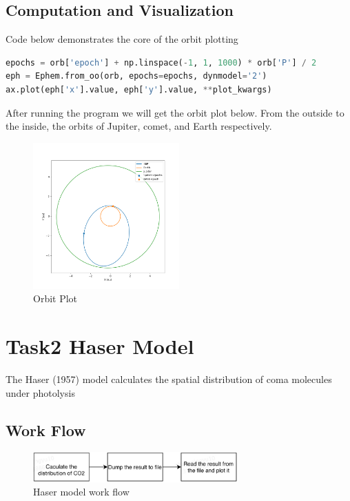 \documentclass{report}
\begin{document}
\subsection{Computation and Visualization}
Code below demonstrates the core of the orbit plotting
\begin{lstlisting}[language=Python]
epochs = orb['epoch'] + np.linspace(-1, 1, 1000) * orb['P'] / 2
eph = Ephem.from_oo(orb, epochs=epochs, dynmodel='2')
ax.plot(eph['x'].value, eph['y'].value, **plot_kwargs)
\end{lstlisting}
After running the program we will get the orbit plot below.
From the outside to the inside, the orbits of Jupiter, comet, and Earth respectively.
\begin{figure}[htb]
    \centering
    \includegraphics[width=0.5\textwidth]{orbit}
    \caption{Orbit Plot}
    \label{fig:OrbitPlot}
\end{figure}

\section{Task2 Haser Model}
The Haser (1957) model calculates the spatial distribution of coma molecules under photolysis

\subsection{Work Flow}
\begin{figure}[htb]
    \centering
    \includegraphics[width=0.7\textwidth]{task2.png}
    \caption{Haser model work flow}
    \label{fig:haser_workflow}
\end{figure}
\end{document}
